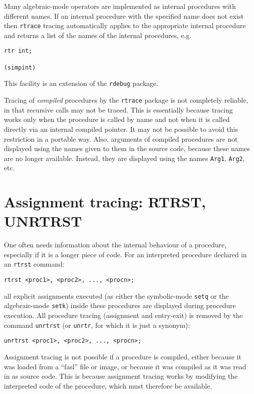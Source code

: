 \documentclass[11pt,a4paper]{article}
\newcommand{\rdebug}{\texttt{rdebug}}
\newcommand{\rtrace}{\texttt{rtrace}}
\begin{document}
Many algebraic-mode operators are implemented as internal procedures
with different names.  If an internal procedure with the specified
name does not exist then \rtrace{} tracing automatically applies to
the appropriate internal procedure and returns a list of the names of
the internal procedures, e.g.
\begin{verbatim}
rtr int;

(simpint)
\end{verbatim}
This facility is an extension of the \rdebug{} package.

Tracing of \emph{compiled} procedures by the \rtrace{} package is not
completely reliable, in that recursive calls may not be traced.  This
is essentially because tracing works only when the procedure is called
by name and not when it is called directly via an internal compiled
pointer.  It may not be possible to avoid this restriction in a
portable way.  Also, arguments of compiled procedures are not
displayed using the names given to them in the source code, because
these names are no longer available.  Instead, they are displayed
using the names \texttt{Arg1}, \texttt{Arg2}, etc.

\section{Assignment tracing: RTRST, UNRTRST}

One often needs information about the internal behaviour of a
procedure, especially if it is a longer piece of code.  For an
interpreted procedure declared in an \texttt{rtrst} command:
\begin{verbatim}
rtrst <proc1>, <proc2>, ..., <procn>;
\end{verbatim}
all explicit assignments executed (as either the symbolic-mode
\texttt{setq} or the algebraic-mode \texttt{setk})
inside these procedures are displayed during procedure execution.  All
procedure tracing (assignment and entry-exit) is removed by the
command \texttt{unrtrst} (or \texttt{unrtr}, for which it is just a
synonym):
\begin{verbatim}
unrtrst <proc1>, <proc2>, ..., <procn>;
\end{verbatim}
Assignment tracing is not possible if a procedure is compiled, either
because it was loaded from a ``fasl'' file or image, or because it was
compiled as it was read in as source code.  This is because assignment
tracing works by modifying the interpreted code of the procedure,
which must therefore be available.
\end{document}
